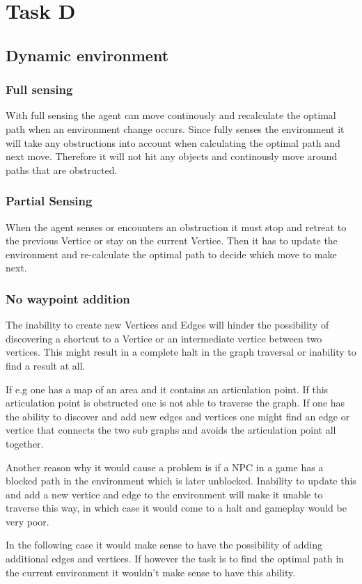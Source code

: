 
\chapter{Task D}
\section{Dynamic environment}

\subsection{Full sensing}
With full sensing the agent can move continously and recalculate the optimal
path when an environment change occurs. Since fully senses the environment it
will take any obstructions into account when calculating the optimal path and
next move. Therefore it will not hit any objects and continously move around
paths that are obstructed.


\subsection{Partial Sensing}
When the agent senses or encounters an obstruction it must stop and retreat to
the previous Vertice or stay on the current Vertice. Then it has to update the 
environment and re-calculate the optimal path to decide which move to make next.

\subsection{No waypoint addition}
The inability to create new Vertices and Edges will hinder the possibility of
discovering a shortcut to a Vertice or an intermediate vertice between two
vertices.  This might result in a complete halt in the graph traversal or
inability to find a result at all.

If e.g one has a map of an area and it contains an articulation point. If this
articulation point is obstructed one is not able to traverse the graph. If one
has the ability to discover and add new edges and vertices one might find an
edge or vertice that connects the two sub graphs and avoids the articulation
point all together.

Another reason why it would cause a problem is if a NPC in a game has a blocked
path in the environment which is later unblocked. Inability to update this and
add a new vertice and edge to the environment will make it unable to traverse
this way, in which case it would come to a halt and gameplay would be very poor.

In the following case it would make sense to have the possibility of adding
additional edges and vertices.  If however the task is to find the optimal path
in the current environment it wouldn't make sense to have this ability.





